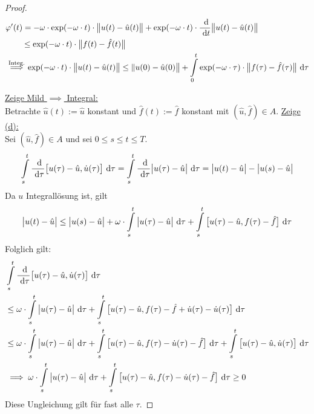 \begin{proof}
	\begin{align*}
		&\varphi'(t)=-\omega\cdot\exp(-\omega\cdot t)\cdot\big\Vert u(t)-\hat{u}(t)\big\Vert
		+\exp(-\omega\cdot t)\cdot\frac{\text{ d}}{\text{ d} t}\big\Vert u(t)-\hat{u}(t)\big\Vert\\
		&\qquad\stackrel{}{\leq}
		\exp(-\omega\cdot t)\cdot\big\Vert f(t)-\hat{f}(t)\big\Vert\\
		&\stackrel{\text{Integ.}}{\implies}
		\exp(-\omega\cdot t)\cdot\big\Vert u(t)-\hat{u}(t)\big\Vert
		\leq\Vert u(0)-\hat{u}(0)\big\Vert+\int\limits_0^t\exp(-\omega\cdot\tau)\cdot\big\Vert f(\tau)-\hat{f}(\tau)\big\Vert\text{ d}\tau
	\end{align*}
	
	\underline{Zeige Mild $\implies$ Integral:}\\
	Betrachte $\hat{u}(t):=\hat{u}$ konstant und $\hat{f}(t):=\hat{f}$ konstant mit $(\hat{u},\hat{f})\in A$.\nl 
	\underline{Zeige (d):}\\
	Sei $(\hat{u},\hat{f})\in A$ und sei $0\leq s\leq t\leq T$.
	\begin{align*}
		\int\limits_s^t\frac{\text{ d}}{\text{ d}\tau}\big[u(\tau)-\hat{u},\dot{u}(\tau)\big]\text{ d}\tau
		=\int\limits_s^t\frac{\text{ d}}{\text{ d}\tau}\big|u(\tau)-\hat{u}\big|\text{ d}\tau
		=\big|u(t)-\hat{u}\big|-\big|u(s)-\hat{u}\big|
	\end{align*}
	Da $u$ Integrallösung ist, gilt
	\begin{align*}
		\big|u(t)-\hat{u}\big|\leq\big| u(s)-\hat{u}\big|+\omega\cdot \int\limits_s^t\big|u(\tau)-\hat{u}\big|\text{ d}\tau+\int\limits_s^t\big[u(\tau)-\hat{u},f(\tau)-\hat{f}\big]\text{ d}\tau
	\end{align*}
	Folglich gilt:
	\begin{align*}
		&\int\limits_s^t\frac{\text{ d}}{\text{ d}\tau}\big[u(\tau)-\hat{u},\dot{u}(\tau)\big]\text{ d}\tau\\
		&\leq\omega\cdot\int\limits_s^t\big|u(\tau)-\hat{u}\big|\text{ d}\tau+\int\limits_s^t\big[u(\tau)-\hat{u},f(\tau)-\hat{f}+\dot{u}(\tau)-\dot{u}(\tau)\big]\text{ d}\tau\\
		&\leq\omega\cdot\int\limits_s^t\big| u(\tau)-\hat{u}\big|\text{ d}\tau+\int\limits_s^t\big[u(\tau)-\hat{u},f(\tau)-\dot{u}(\tau)-\hat{f}\big]\text{ d}\tau
		+\int\limits_s^t\big[u(\tau)-\hat{u},\dot{u}(\tau)\big]\text{ d}\tau\\
		&\implies
		\omega\cdot\int\limits_s^t\big|u(\tau)-\hat{u}\big|\text{ d}\tau+\int\limits_s^t\big[u(\tau)-\hat{u},f(\tau)-\dot{u}(\tau)-\hat{f}\big]\text{ d}\tau\geq0
	\end{align*}
	Diese Ungleichung gilt für fast alle $\tau$. 

\end{proof}
